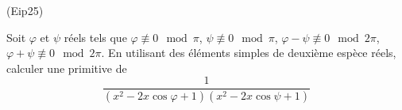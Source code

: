 \begin{tiny}(Eip25)\end{tiny} Soit $\varphi$ et $\psi$ réels tels que $\varphi \not \equiv 0 \mod \pi$, $\psi \not \equiv 0 \mod \pi$, $\varphi -\psi \not \equiv 0 \mod 2\pi$, $\varphi +\psi \not \equiv 0 \mod 2\pi$.\newline
En utilisant des éléments simples de deuxième espèce réels, calculer une primitive de
\begin{displaymath}
 \frac{1}{\left(x^2-2x\cos \varphi +1\right) \left(x^2-2x\cos \psi +1\right)}
\end{displaymath}
 